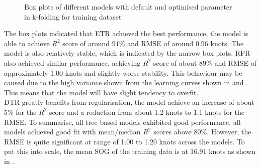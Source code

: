\begin{figure}[ht]
    \centering
    \caption{Box plots of different models with default and optimised parameter in k-folding for training dataset}
    \label{fig:train_boxplot_r2_rmse}
\end{figure}

The box plots indicated that ETR achieved the best performance, the model is able to achieve $R^2$ score of around $91\%$ and RMSE of around 0.96 knots. The model is also relatively stable, which is indicated by the narrow box plots. RFR also achieved similar performance, achieving $R^2$ score of about $89\%$ and RMSE of approximately 1.00 knots and slightly worse stability. This behaviour may be caused due to the high variance shown from the learning curves shown in  and . This means that the model will have slight tendency to overfit.\\

DTR greatly benefits from regularisation, the model achieve an increase of about $5\%$ for the $R^2$ score and a reduction from about 1.2 knots to 1.1 knots for the RMSE. To summarise, all tree based models exhibited good performance, all models achieved good fit with mean/median $R^2$ scores above $80\%$. However, the RMSE is quite significant at range of 1.00 to 1.20 knots across the models. To put this into scale, the mean SOG of the training data is at 16.91 knots as shown in .\\  